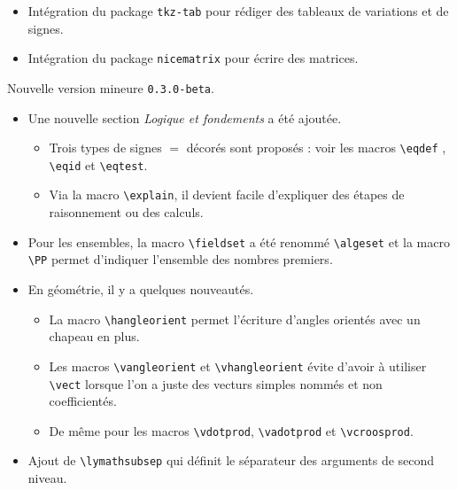 \documentclass[12pt,a4paper]{article}
\theoremstyle{definition}
\begin{document}
\begin{description}[leftmargin=1em]
\begin{itemize}
        \item Intégration du package \verb+tkz-tab+ pour rédiger des tableaux de variations et de signes.

        \item Intégration du package \verb+nicematrix+ pour écrire des matrices.
    \end{itemize}


    \item[2019-07-23] Nouvelle version mineure \verb+0.3.0-beta+.
    \begin{itemize}
        \item Une nouvelle section \emph{\og Logique et fondements \fg} a été ajoutée.
        \begin{itemize}
            \item Trois types de signes $=$ décorés sont proposés : voir les macros \verb+\eqdef+ , \verb+\eqid+ et \verb+\eqtest+.

            \item Via la macro \verb+\explain+, il devient facile d'expliquer des étapes de raisonnement ou des calculs.
        \end{itemize}

        \item Pour les ensembles, la macro \verb+\fieldset+ a été renommé \verb+\algeset+ et la macro \verb+\PP+ permet d'indiquer l'ensemble des nombres premiers.

        \item En géométrie, il y a quelques nouveautés.
        \begin{itemize}
            \item La macro \verb+\hangleorient+ permet l'écriture d'angles orientés avec un chapeau en plus.

            \item Les macros \verb+\vangleorient+ et \verb+\vhangleorient+ évite d'avoir à utiliser \verb+\vect+ lorsque l'on a juste des vecturs simples nommés et non coefficientés.

            \item De même pour les macros \verb+\vdotprod+, \verb+\vadotprod+ et \verb+\vcroosprod+.
        \end{itemize}

        \item Ajout de \verb+\lymathsubsep+ qui définit le séparateur des arguments de second niveau.
    \end{itemize}


\end{description}
\end{document}
